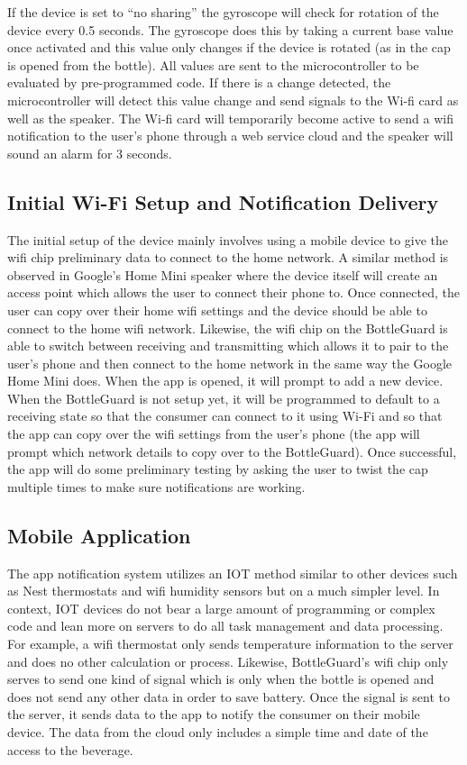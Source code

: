 \documentclass[12pt]{article}
\begin{document}
	If the device is set to “no sharing” the gyroscope will check for rotation of the device every 0.5 seconds. The gyroscope does this by taking a current base value once activated and this value only changes if the device is rotated (as in the cap is opened from the bottle). All values are sent to the microcontroller to be evaluated by pre-programmed code. If there is a change detected, the microcontroller will detect this value change and send signals to the Wi-fi card as well as the speaker. The Wi-fi card will temporarily become active to send a wifi notification to the user’s phone through a web service cloud and the speaker will sound an alarm for 3 seconds. 
	
	\subsection*{Initial Wi-Fi Setup and Notification Delivery}
	The initial setup of the device mainly involves using a mobile device to give the wifi chip preliminary data to connect to the home network. A similar method is observed in Google’s Home Mini speaker where the device itself will create an access point which allows the user to connect their phone to. Once connected, the user can copy over their home wifi settings and the device should be able to connect to the home wifi network. Likewise, the wifi chip on the BottleGuard is able to switch between receiving and transmitting which allows it to pair to the user’s phone and then connect to the home network in the same way the Google Home Mini does. When the app is opened, it will prompt to add a new device. When the BottleGuard is not setup yet, it will be programmed to default to a receiving state so that the consumer can connect to it using Wi-Fi and so that the app can copy over the wifi settings from the user’s phone (the app will prompt which network details to copy over to the BottleGuard). Once successful, the app will do some preliminary testing by asking the user to twist the cap multiple times to make sure notifications are working.
	
	\subsection*{Mobile Application}
	The app notification system utilizes an IOT method similar to other devices such as Nest thermostats and wifi humidity sensors but on a much simpler level. In context, IOT devices do not bear a large amount of programming or complex code and lean more on servers to do all task management and data processing. For example, a wifi thermostat only sends temperature information to the server and does no other calculation or process. Likewise, BottleGuard’s wifi chip only serves to send one kind of signal which is only when the bottle is opened and does not send any other data in order to save battery. Once the signal is sent to the server, it sends data to the app to notify the consumer on their mobile device. The data from the cloud only includes a simple time and date of the access to the beverage. 
	
\end{document}
